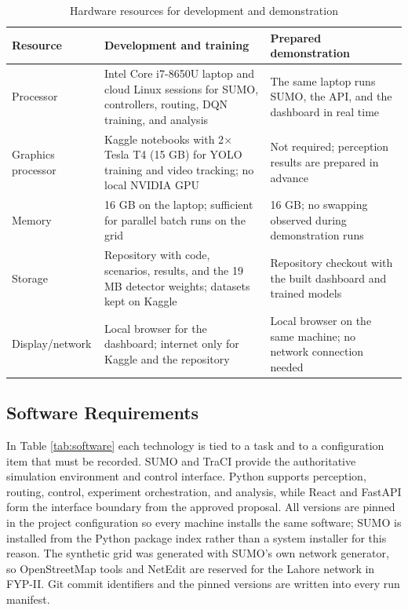 \begin{table}[htbp]
\centering
\caption{Hardware resources for development and demonstration}
\label{tab:hardware}
\begin{tabularx}{\textwidth}{p{}YY}
\toprule
\textbf{Resource} & \textbf{Development and training} & \textbf{Prepared demonstration}\\
\midrule
Processor & Intel Core i7-8650U laptop and cloud Linux sessions for SUMO, controllers, routing, DQN training, and analysis & The same laptop runs SUMO, the API, and the dashboard in real time\\
Graphics processor & Kaggle notebooks with 2$\times$ Tesla T4 (15 GB) for YOLO training and video tracking; no local NVIDIA GPU & Not required; perception results are prepared in advance\\
Memory & 16 GB on the laptop; sufficient for parallel batch runs on the grid & 16 GB; no swapping observed during demonstration runs\\
Storage & Repository with code, scenarios, results, and the 19 MB detector weights; datasets kept on Kaggle & Repository checkout with the built dashboard and trained models\\
Display/network & Local browser for the dashboard; internet only for Kaggle and the repository & Local browser on the same machine; no network connection needed\\
\bottomrule
\end{tabularx}
\end{table}

\subsection{Software Requirements}

In Table \ref{tab:software} each technology is tied to a task and to a configuration item that must be recorded. SUMO and TraCI provide the authoritative simulation environment and control interface. Python supports perception, routing, control, experiment orchestration, and analysis, while React and FastAPI form the interface boundary from the approved proposal. All versions are pinned in the project configuration so every machine installs the same software; SUMO is installed from the Python package index rather than a system installer for this reason. The synthetic grid was generated with SUMO's own network generator, so OpenStreetMap tools and NetEdit are reserved for the Lahore network in FYP-II. Git commit identifiers and the pinned versions are written into every run manifest.

